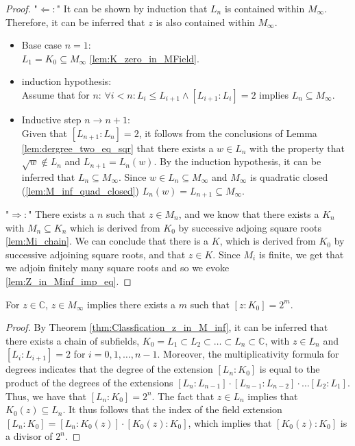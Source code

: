 \begin{proof}
    \leanok
    "$\Leftarrow:$"
    It can be shown by induction that $L_n$ is contained within $M_{\infty}$. 
    Therefore, it can be inferred that $z$ is also contained within $M_{\infty}$.
    \begin{itemize}
        \item Base case $n=1$: \\
            $L_1 = K_0 \subseteq M_{\infty}$ \ref{lem:K_zero_in_MField}.
        
        \item induction hypothesis: \\
            Assume that for $n$: $\forall i < n: L_i \le L_{i+1} \land [L_{i+1}:L_i]=2$ implies $L_n \subseteq M_{\infty}$.
        \item Inductive step $n \to n+1$: \\
            Given that $[L_{n+1}:L_n] = 2$, it follows from the conclusions of Lemma \ref{lem:dergree_two_eq_sqr} that there exists a $w \in L_n$ with the property that $ \sqrt{w} \notin L_n$ and $L_{n+1} = L_n(w)$.
            By the induction hypothesis, it can be inferred that $L_n \subseteq M_{\infty}$. Since $w \in L_n  \subseteq M_{\infty}$ and $ M_{\infty}$ is quadratic closed (\ref{lem:M_inf_quad_closed}) $L_n(w) = L_{n+1} \subseteq M_{\infty}$.
    \end{itemize}
    "$\Rightarrow:$" There exists a $n$ such that $z\in M_n$, and we know that there exists a $K_n$ with $M_n \subseteq K_n$ which is derived from $K_0$ by successive adjoing square roots \ref{lem:Mi_chain}. 
    We can conclude that there is a $K$, which is derived from $K_0$ by successive adjoining square roots, and that $z\in K$. 
    Since $M_i$ is finite, we get that we adjoin finitely many square roots and so we evoke \ref{lem:Z_in_Minf_imp_eq}. 

\end{proof}

\begin{lemma}
    \label{lem:Classfication_z_in_M_inf_2m}
    \leanok
    For $z \in \mathbb{C}$, $z \in M_{\infty}$ implies there exists a $m$ such that $[z:K_0] = 2^m$.
\end{lemma}

\begin{proof}
    \leanok
    By Theorem \ref{thm:Classfication_z_in_M_inf}, it can be inferred that there exists a chain of subfields, $K_0 = L_1 \subset L_2 \subset \dots \subset L_n \subset \mathbb{C}$, with $z \in L_n$ and $[L_i : L_{i+1}] = 2$ for $i = 0, 1, \dots, n-1$. 
    Moreover, the multiplicativity formula for degrees indicates that the degree of the extension $[L_n : K_0]$ is equal to the product of the degrees of the extensions $[L_n : L_{n-1}] \cdot [L_{n-1} : L_{n-2}] \cdot \dots [L_2 : L_1]$.
    Thus, we have that $[L_n : K_0] = 2^n$. 
    The fact that $z\in L_n$ implies that $K_0(z)\subseteq L_n$. 
    It thus follows that the index of the field extension $[L_n : K_0] = [L_n : K_0(z)]\cdot [K_0(z) : K_0]$, which implies that $[K_0(z) : K_0]$ is a divisor of $2^n$. 
\end{proof}

